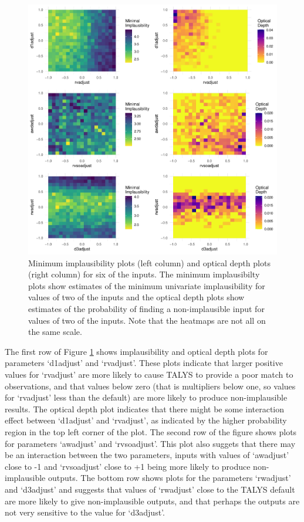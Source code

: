 \documentclass[
  12pt,
  a4paper,
  twoside]{book}
\begin{document}
\begin{figure}[H]

{\centering \includegraphics[width=0.8\linewidth]{figures/impl_optical_depth} 

}

\caption{Minimum implausibility plots (left column) and optical depth plots (right column) for six of the inputs. The minimum implausibilty plots show estimates of the minimum univariate implausibility for values of two of the inputs and the optical depth plots show estimates of the probability of finding a non-implausible input for values of two of the inputs. Note that the heatmaps are not all on the same scale.}\label{fig:implausibility-plots}
\end{figure}

The first row of Figure \ref{fig:implausibility-plots} shows implausibility and optical depth plots for parameters `d1adjust' and `rvadjust'. These plots indicate that larger positive values for `rvadjust' are more likely to cause TALYS to provide a poor match to observations, and that values below zero (that is multipliers below one, so values for `rvadjust' less than the default) are more likely to produce non-implausible results. The optical depth plot indicates that there might be some interaction effect between `d1adjust' and `rvadjust', as indicated by the higher probability region in the top left corner of the plot. The second row of the figure shows plots for parameters `awadjust' and `rvsoadjust'. This plot also suggets that there may be an interaction between the two parameters, inputs with values of `awadjust' close to -1 and `rvsoadjust' close to +1 being more likely to produce non-implausible outputs. The bottom row shows plots for the parameters `rwadjust' and `d3adjust' and suggests that values of `rwadjust' close to the TALYS default are more likely to give non-implausible outputs, and that perhaps the outputs are not very sensitive to the value for `d3adjust'.
\end{document}

